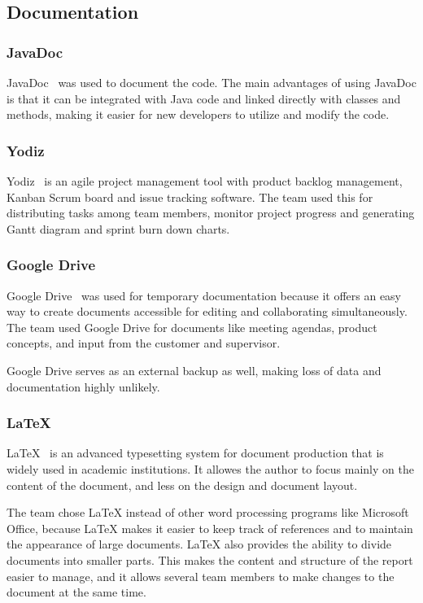 \subsection{Documentation}

\subsubsection{JavaDoc}
JavaDoc~\cite{javadoc} was used to document the code. The main advantages of using JavaDoc is that it can be integrated with Java code and linked directly with classes and methods, making it easier for new developers to utilize and modify the code.

\subsubsection{Yodiz}
Yodiz~\cite{yodiz} is an agile project management tool with product backlog management, Kanban Scrum board and issue tracking software. The team used this for distributing tasks among team members, monitor project progress and generating Gantt diagram and sprint burn down charts.

\subsubsection{Google Drive}
Google Drive~\cite{gdrive} was used for temporary documentation because it offers an easy way to create documents accessible for editing and collaborating simultaneously. The team used Google Drive for documents like meeting agendas, product concepts, and input from the customer and supervisor. 

Google Drive serves as an external backup as well, making loss of data and documentation highly unlikely.

\subsubsection{\LaTeX}
\LaTeX~\cite{latex} is an advanced typesetting system for document production that is widely used in
academic institutions. It allowes the author to focus mainly on the content of the document, and less on the design and document layout.

The team chose LaTeX instead of other word processing programs like Microsoft Office, because LaTeX makes it easier to keep track of references and to maintain the appearance of large documents. 
LaTeX also provides the ability to divide documents into smaller parts. This makes the content and structure of the report easier to manage, and it allows several team members to make changes to the document at the same time.

